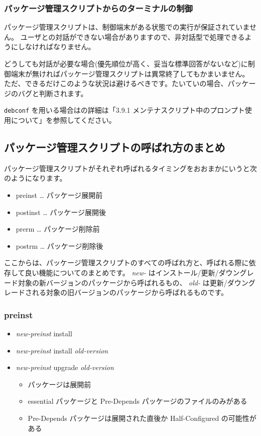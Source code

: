 \documentclass[mingoth,a4paper]{jsarticle}
\begin{document}
\subsubsection{パッケージ管理スクリプトからのターミナルの制御}
パッケージ管理スクリプトは、制御端末がある状態での実行が保証されていません。
ユーザとの対話ができない場合がありますので、非対話型で処理できるようにしなければなりません。

どうしても対話が必要な場合(優先順位が高く、妥当な標準回答がないなど)に制御端末が無ければパッケージ管理スクリプトは異常終了してもかまいません。
ただ、できるだけこのような状況は避けるべきです。たいていの場合、パッケージのバグと判断されます。

{\tt debconf} を用いる場合はの詳細は「3.9.1 メンテナスクリプト中のプロンプト使用について」を参照してください。


\subsection{パッケージ管理スクリプトの呼ばれ方のまとめ}
パッケージ管理スクリプトがそれぞれ呼ばれるタイミングをおおまかにいうと次のようになります。

\begin{itemize}
\item preinst  … パッケージ展開前
\item postinst … パッケージ展開後
\item prerm    … パッケージ削除前
\item postrm   … パッケージ削除後
\end{itemize}

ここからは、パッケージ管理スクリプトのすべての呼ばれ方と、呼ばれる際に依存して良い機能についてのまとめです。
{\it new-} はインストール/更新/ダウングレード対象の新バージョンのパッケージから呼ばれるもの、
{\it old-} は更新/ダウングレードされる対象の旧バージョンのパッケージから呼ばれるものです。


\subsubsection{preinst}

\begin{itemize}
\item {\it new-preinst} install
\item {\it new-preinst} install {\it old-version}
\item {\it new-preinst} upgrade {\it old-version}
  \begin{itemize}
  \item パッケージは展開前
  \item essential パッケージと Pre-Depends パッケージのファイルのみがある
  \item Pre-Depends パッケージは展開された直後か Half-Configured の可能性がある
  \end{itemize}
\end{itemize}
\end{document}
